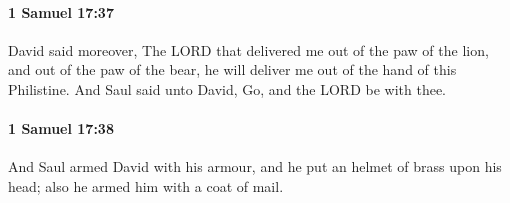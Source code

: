 		\paragraph{1 Samuel 17:37} %
			\label{1SAMUEL-17-37}

			David said moreover, The LORD that delivered me out of the paw of the lion, and out of the paw of the bear, he will deliver me out of the hand of this Philistine. And Saul said unto David, Go, and the LORD be with thee.


		\paragraph{1 Samuel 17:38} %
			\label{1SAMUEL-17-38}

			And Saul armed David with his armour, and he put an helmet of brass upon his head; also he armed him with a coat of mail.


